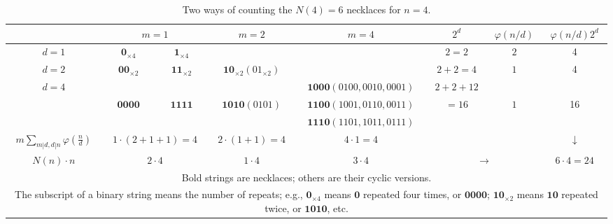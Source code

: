 \documentclass[preprint]{revtex4-1}
\begin{document}
\begin{table}[h]\footnotesize
\caption{Two ways of counting the $N(4) = 6$ necklaces for $n = 4$.
}
\begin{center}
\begin{tabularx}{\textwidth}{c | c  c | c | c | c | c | c }
\hline
        & \multicolumn{2}{c|}{$m = 1$}
        & $m = 2$
        & $m = 4$   & $2^d$ & $\varphi(n/d)$ & $\varphi(n/d) 2^d$\\
\hline
$d = 1$ & \hspace{1mm} $\mathbf{0}_{\times4}$ \hspace{1mm}
        & \hspace{1mm} $\mathbf{1}_{\times4}$ \hspace{1mm} & & & $2 = 2$ & $2$ & 4 \\
\hline
$d = 2$ & $\mathbf{00}_{\times2}$ & $\mathbf{11}_{\times2}$
        & \hspace{1mm} $\mathbf{10}_{\times2} (01_{\times2})$
          \hspace{1mm} & & $2 + 2 =4$ & $1$ & 4 \\
\hline
\multirow{3}{*}{$d = 4$}
      & & & & \hspace{1mm} $\mathbf{1000} (0100, 0010, 0001)$
              \hspace{1mm} & $2 + 2 + 12$& \\
      & $\mathbf{0000}$ & $\mathbf{1111}$ & $\mathbf{1010} (0101)$
            & $\mathbf{1100} (1001, 0110, 0011)$ & $=16$ & $1$ & 16 \\
      & & & &   $\mathbf{1110} (1101, 1011, 0111)$ & &  \\
\hline
$m \sum_{m|d, d|n} \varphi(\frac{n}{d})$
      & \multicolumn{2}{c|}{$1\cdot(2+1+1) = 4$}
      & $2\cdot(1+1) = 4$ & $4\cdot1 = 4$ &  \multicolumn{2}{c|}{} &  $\downarrow$\\
\hline
$N(n)\cdot n$ & \multicolumn{2}{c|}{$2 \cdot 4$} & $1 \cdot 4$ & $3 \cdot 4$ &
  \multicolumn{2}{c|}{$\rightarrow$} & $6\cdot4 = 24$ \\
\hline
\multicolumn{8}{p{\linewidth}}{
  Bold strings are necklaces; others are their cyclic versions.
}
\\
\multicolumn{8}{p{\linewidth}}{
The subscript of a binary string means the number of repeats;
e.g.,
$\mathbf{0}_{\times4}$ means $\mathbf{0}$ repeated four times, or $\mathbf{0000}$;
$\mathbf{10}_{\times2}$ means $\mathbf{10}$ repeated twice, or $\mathbf{1010}$, etc.
}
\\
\hline
\end{tabularx}
\end{center}
\label{tab:countnecklace}
\end{table}
\end{document}
